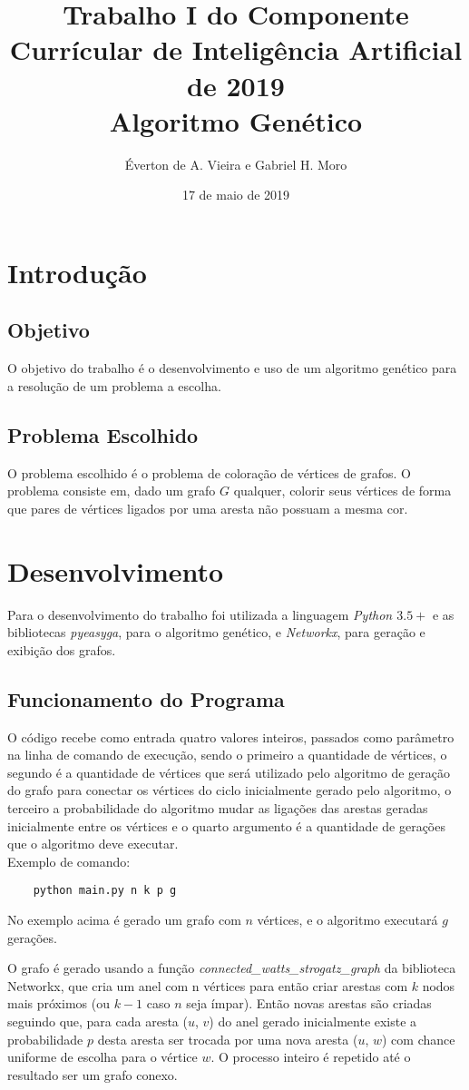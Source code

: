 \documentclass[a4paper, 12pt]{article}
\title{Trabalho I do Componente Currícular de Inteligência Artificial de 2019 \\ %
        \large Algoritmo Genético}
\author{Éverton de A. Vieira e Gabriel H. Moro}
\date{17 de maio de 2019}
\begin{document}
    \maketitle{}
    
    \section*{Introdução}
    \subsection*{Objetivo}
    O objetivo do trabalho é o desenvolvimento e uso de um algoritmo genético para a resolução de um problema a escolha. 
    \subsection*{Problema Escolhido}
    O problema escolhido é o problema de coloração de vértices de grafos. O problema consiste em, dado um grafo $G$ qualquer, colorir seus vértices de forma que pares de vértices ligados por uma aresta não possuam a mesma cor.

    \section*{Desenvolvimento}
    Para o desenvolvimento do trabalho foi utilizada a linguagem \emph{Python $3.5+$} e as bibliotecas \emph{pyeasyga}, para o algoritmo genético, e \emph{Networkx}, para geração e exibição dos grafos.
    \subsection*{Funcionamento do Programa}
    O código recebe como entrada quatro valores inteiros, passados como parâmetro na linha de comando de execução, sendo o primeiro a quantidade de vértices,
    o segundo é a quantidade de vértices que será utilizado pelo algoritmo de geração do grafo para conectar os vértices do ciclo inicialmente gerado pelo algoritmo,
    o terceiro a probabilidade do algoritmo mudar as ligações das arestas geradas inicialmente entre os vértices 
    e o quarto argumento é a quantidade de gerações que o algoritmo deve executar.\\ %

    Exemplo de comando:
    \begin{verbatim}
    python main.py n k p g
    \end{verbatim}

    No exemplo acima é gerado um grafo com $n$ vértices, e o algoritmo executará $g$ gerações.

    O grafo é gerado usando a função \emph{connected\_watts\_strogatz\_graph} da biblioteca Networkx, que cria um anel com n vértices para então criar arestas com $k$ nodos mais próximos (ou $k - 1$ caso $n$ seja ímpar). Então novas arestas são criadas seguindo que, para cada aresta ($u$, $v$) do anel gerado inicialmente existe a probabilidade $p$ desta aresta ser trocada por uma nova aresta ($u$, $w$) com chance uniforme de escolha para o vértice $w$. O processo inteiro é repetido até o resultado ser um grafo conexo.
\end{document}
